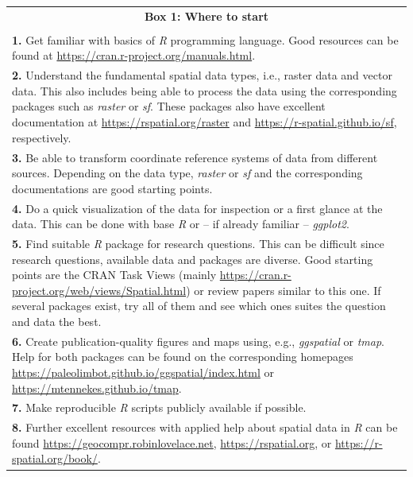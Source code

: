 \documentclass[smallextended]{svjour3}       %
\begin{document}
\begin{table}

\small

\begin{tabularx}{1\textwidth}{|X|}

\hline
\multicolumn{1}{|c|}{\textbf{Box 1: Where to start}} \\

\\

\textbf{1.} Get familiar with basics of \textit{R} programming language. 
Good resources can be found at \url{https://cran.r-project.org/manuals.html}. \\

\textbf{2.} Understand the fundamental spatial data types, i.e., raster data and vector data.
This also includes being able to process the data using the corresponding packages such as \textit{raster} or \textit{sf}. 
These packages also have excellent documentation at \url{https://rspatial.org/raster} and \url{https://r-spatial.github.io/sf}, respectively. \\

\textbf{3.} Be able to transform coordinate reference systems of data from different sources. Depending on the data type, \textit{raster} or \textit{sf} and the corresponding documentations are good starting points. \\

\textbf{4.} Do a quick visualization of the data for inspection or a first glance at the data. 
This can be done with base \textit{R} or -- if already familiar -- \textit{ggplot2}. \\

\textbf{5.} Find suitable \textit{R} package for research questions. 
This can be difficult since research questions, available data and packages are diverse. 
Good starting points are the CRAN Task Views (mainly \url{https://cran.r-project.org/web/views/Spatial.html}) or review papers similar to this one. 
If several packages exist, try all of them and see which ones suites the question and data the best. \\

\textbf{6.} Create publication-quality figures and maps using, e.g., \textit{ggspatial} or \textit{tmap}. 
Help for both packages can be found on the corresponding homepages \url{https://paleolimbot.github.io/ggspatial/index.html} or \url{https://mtennekes.github.io/tmap}. \\

\textbf{7.} Make reproducible \textit{R} scripts publicly available if possible. \\

\textbf{8.} Further excellent resources with applied help about spatial data in \textit{R} can be found \url{https://geocompr.robinlovelace.net}, \url{https://rspatial.org}, or \url{https://r-spatial.org/book/}. \\

\hline
\end{tabularx}
\end{table}
\end{document}
